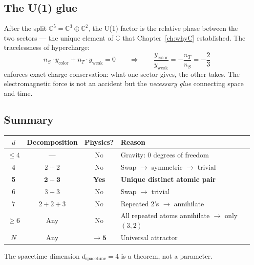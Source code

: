 \documentclass[12pt]{article}
\theoremstyle{remark}
\theoremstyle{definition}
\begin{document}
\subsection{The U(1) glue}
\label{sec:glue}

After the split $\mathbb{C}^5 = \mathbb{C}^3 \oplus \mathbb{C}^2$, the U(1) factor is the relative phase between the two sectors --- the unique element of $\mathbb{C}$ that Chapter~\ref{ch:whyC} established. The tracelessness of hypercharge:
\begin{equation}
n_S \cdot y_\text{color} + n_T \cdot y_\text{weak} = 0 \qquad\Rightarrow\qquad \frac{y_\text{color}}{y_\text{weak}} = -\frac{n_T}{n_S} = -\frac{2}{3}
\end{equation}
enforces exact charge conservation: what one sector gives, the other takes. The electromagnetic force is not an accident but the \emph{necessary glue} connecting space and time.

\subsection{Summary}

\begin{center}
\begin{tabular}{cccl}
\hline
$d$ & Decomposition & Physics? & Reason \\
\hline
$\leq 4$ & --- & No & Gravity: 0 degrees of freedom \\
4 & $2+2$ & No & Swap $\to$ symmetric $\to$ trivial \\
\textbf{5} & $\mathbf{2+3}$ & \textbf{Yes} & \textbf{Unique distinct atomic pair} \\
6 & $3+3$ & No & Swap $\to$ trivial \\
7 & $2+2+3$ & No & Repeated 2's $\to$ annihilate \\
$\geq 6$ & Any & No & All repeated atoms annihilate $\to$ only $(3,2)$ \\
$N$ & Any & $\to \mathbf{5}$ & Universal attractor \\
\hline
\end{tabular}
\end{center}

\noindent The spacetime dimension $d_\text{spacetime} = 4$ is a theorem, not a parameter.



\end{document}

